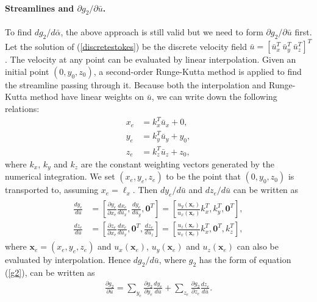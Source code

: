 \documentclass[times]{fldauth}
\begin{document}
\paragraph{Streamlines and $\partial g_2/\partial {\bar{u}}$.}
To find $d g_2/d \bar{\alpha}$, the above approach is still valid but
we need to form $\partial{g_2}/\partial{\bar{u}}$ first. Let the
solution of (\ref{discretestokes}) be the discrete velocity field
$\bar{u} = [\bar{u}_{x}^T\ \bar{u}_{y}^T\ \bar{u}_{z}^T]^T$. The velocity at
any point can be evaluated by linear interpolation. Given an initial
point $(0,y_{0},z_{0})$, a second-order Runge-Kutta method is applied to
find the streamline passing through it. Because both the interpolation
and Runge-Kutta method have linear weights on $\bar{u}$, we can write
down the following relations:
\begin{align*}
 x_e & = k_{x}^T \bar{u}_{x}+0,\\
 y_e & = k_{y}^T \bar{u}_{y}+y_{0},\\
 z_e & = k_{z}^T \bar{u}_{z}+z_{0},
\end{align*}
where $k_{x}$, $k_{y}$ and $k_{z}$ are the constant weighting vectors
generated by the numerical integration. We set $(x_e,y_e,z_e)$ to be
the point that $(0,y_{0},z_{0})$ is transported to, assuming $x_e=
\ell_x$.  Then $dy_e/d\bar{u}$ and $dz_e/d\bar{u}$ can be written as
\begin{align}
\begin{split}
 \frac{dy_e}{d\bar{u}}
 &=  \left[ \frac{\partial{y_e}}{\partial{x_e}}
   \frac{dx_e}{d\bar{u}_{x}},
   \frac{dy_e}{d\bar{u}_{y}},
   \mathbf{0}^T\right]
 = \left[\frac{u_y(\mathbf{x}_e)}{u_x(\mathbf{x}_e)}k_{x}^T,
   k_{y}^T ,\mathbf{0}^T \right], \\
 \frac{dz_e}{d\bar{u}}
 &=  \left[ \frac{\partial{z_e}}{\partial{x_e}}
   \frac{dx_e}{d\bar{u}_{x}},
   \mathbf{0}^T,
   \frac{dz_{e}}{d\bar{u}_{z}}\right]
 = \left[\frac{u_z(\mathbf{x}_e)}{u_x(\mathbf{x}_e)}k_{x}^T,
   \mathbf{0}^T, k_{z}^T \right],
\end{split}
\end{align}
where $\mathbf{x}_e= (x_e,y_e,z_e)$ and $u_x(\mathbf{x}_e)$,
$u_y(\mathbf{x}_e)$ and $u_z(\mathbf{x}_e)$ can also be evaluated by
interpolation. Hence $dg_2/d\bar{u}$, where $g_2$ has the form of
equation (\ref{g2}), can be written as
\begin{align}
  \frac{\partial g_2}{\partial \bar{u}}
  = \sum_{y_e} \frac{\partial{g_2}}{\partial{y_e}}
  \frac{dy_e}{d\bar{u}}
  + \sum_{z_e}
  \frac{\partial{g_2}}{\partial{z_e}}\frac{dz_e}{d\bar{u}}.
\end{align}
\end{document}
